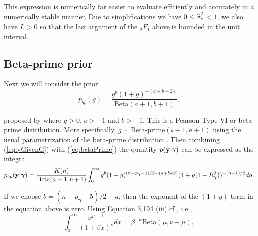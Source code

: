 \documentclass[12pt]{article}
\def\vectorfontone{\bf}
\def\vectorfonttwo{\boldsymbol}
\def\vy{{\vectorfontone y}}                      %
\def\vgamma{{\vectorfonttwo \gamma}}             %
\def\ds{\displaystyle}
\begin{document}
 


\noindent 
This expression is numerically far easier to evaluate efficiently and accurately in a numerically stable manner. Due to simplifications
we have $0\le \widehat{\sigma}_\vgamma^2<1$, we also have $L>0$ so that the last argument
of the ${}_2F_1$ above is bounded in the unit interval.  







\subsection{Beta-prime prior} 

Next we will consider the prior 
\begin{equation}\label{eq:betaPrime}
\ds p_{bp}(g) = \frac{g^{b}(1 + g)^{-(a+b+2)}}{\mbox{Beta}(a+1,b+1)},
\end{equation}

\noindent proposed by \cite{Maruyama2011} where $g>0$, $a>-1$ and $b>-1$. 
This is a Pearson Type VI or beta-prime distribution. More specifically, 
$g\sim \mbox{Beta-prime}(b+1,a+1)$ using the usual parametrization of 
the beta-prime distribution \citep{Johnson1995}.
Then combining (\ref{eq:yGivenG}) with (\ref{eq:betaPrime}) the quantity $p(\vy|\vgamma)$ 
can be expressed as the integral
$$
\ds p_{bp}(\vy|\vgamma) 
=
\frac{K(n)}{\mbox{Beta}(a+1,b+1)}
\int_0^\infty             
g^{b}(1 + g)^{(n - p_\vgamma - 1)/2 - (a + b + 2)}  (1 + g (1-R_\vgamma^2) )^{-(n-1)/2}  
dg.
$$

\noindent If we choose 
$b = (n - p_\vgamma - 5)/2 - a$, then the exponent of the $(1 + g)$ term in the equation above is zero.
Using Equation 3.194 (iii) of \cite{Gradshteyn2007}, i.e.,
$$
\int_0^\infty \frac{ x^{\mu - 1} }{(1 + \beta x)^\nu} dx = \beta^{-\mu} \mbox{Beta}(\mu,\nu - \mu),
$$
\end{document}
